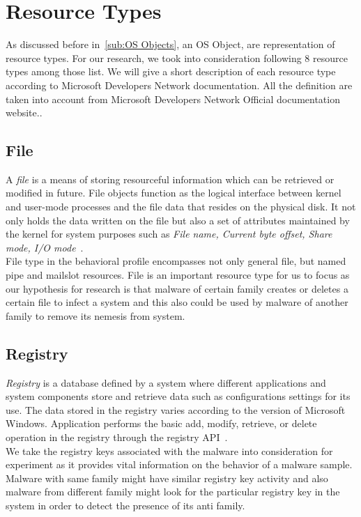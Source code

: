 \section{Resource Types}
\label{sec:Resource Types}
As discussed before in~\autoref{sub:OS Objects}, an OS Object, are representation of resource types.
For our research, we took into consideration following 8 resource types among those list.
We will give a short description of each resource type according to Microsoft Developers Network documentation.
All the definition are taken into account from Microsoft Developers Network Official documentation website.\cite[MSDN]{msdn}.
\subsection{File}
\label{sub:File}
A \emph{file} is a means of storing resourceful information which can be retrieved or modified in future.
File objects function as the logical interface between kernel and user-mode processes and the file data that resides on the physical disk.
It not only holds the data written on the file but also a set of attributes maintained by the kernel for system purposes such as \emph{File name, Current byte offset, Share mode, I/O mode}~\cite[]{msfile}.\\
File type in the behavioral profile encompasses not only general file, but named pipe and mailslot resources. File is an important resource type for us to focus as our hypothesis for research is that malware of certain family creates or deletes a certain file to infect a system and this also could be used by malware of another family to remove its nemesis from system.
\subsection{Registry}
\label{sub:Registry}
\emph{Registry} is a database defined by a system where different applications and system components store and retrieve data such as configurations settings for its use.
The data stored in the registry varies according to the version of Microsoft Windows.
Application performs the basic add, modify, retrieve, or delete operation in the registry through the registry API~\cite[]{msregistry}.\\
We take the registry keys associated with the malware into consideration for experiment as it provides vital information on the behavior of a malware sample. Malware with same family might have similar registry key activity and also malware from different family might look for the particular registry key in the system in order to detect the presence of its anti family.
